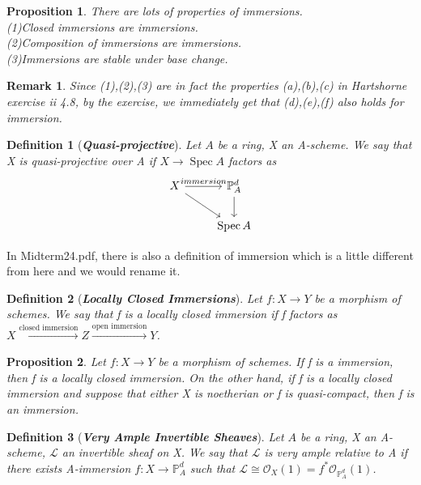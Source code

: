 \documentclass{ctexart}
\newtheorem{definition}{Definition}[section]
\newtheorem{remark}{Remark}[section]
\newtheorem{proposition}{Proposition}[section]
\newcommand{\spec}{\operatorname{Spec}}
\begin{document}
\begin{proposition}
    There are lots of properties of immersions. \\
    (1)Closed immersions are immersions. \\
    (2)Composition of immersions are immersions. \\
    (3)Immersions are stable under base change. 
    \label{Proposition 6.11}
\end{proposition}
\begin{remark}
    Since (1),(2),(3) are in fact the properties (a),(b),(c) in Hartshorne exercise ii 4.8,
    by the exercise, we immediately get that (d),(e),(f) also holds for immersion.
\end{remark}
\begin{definition}[\textbf{\emph{Quasi-projective}}]
    Let $A$ be a ring, X an A-scheme.
    We say that X is quasi-projective over A if $X \longrightarrow \spec A$ factors as 
    \begin{equation*}
        \begin{tikzcd}
            X \arrow[r, "immersion"] \arrow[dr] &
            \mathbb{P}_{A}^{d} \arrow[d] \\
            & \spec A
        \end{tikzcd}
    \end{equation*}
\end{definition}
In Midterm24.pdf, there is also a definition of immersion which is a little different from here and we would rename it.
\begin{definition}[\textbf{\emph{Locally Closed Immersions}}]
    Let $f: X \longrightarrow Y$ be a morphism of schemes.
    We say that f is a locally closed immersion if f factors as $X \overset{\text{closed immersion}}{\longrightarrow} Z \overset{\text{open immersion}}{\longrightarrow} Y$.
\end{definition}
\begin{proposition}
    Let $f: X \longrightarrow Y$ be a morphism of schemes.
    If f is a immersion, then f is a locally closed immersion.
    On the other hand, if f is a locally closed immersion and suppose that either X is noetherian or f is quasi-compact, then f is an immersion.
    \label{Proposition 6.12}
\end{proposition}
\begin{definition}[\textbf{\emph{Very Ample Invertible Sheaves}}]
    Let $A$ be a ring, X an A-scheme, $\mathcal{L}$ an invertible sheaf on X.
    We say that $\mathcal{L}$ is very ample relative to A if there exists A-immersion $f: X \longrightarrow \mathbb{P}_{A}^{d}$ such that $\mathcal{L} \cong \mathcal{O}_{X}(1) = f^{\ast}\mathcal{O}_{\mathbb{P}_{A}^{d}}(1)$.
\end{definition}
\end{document}
